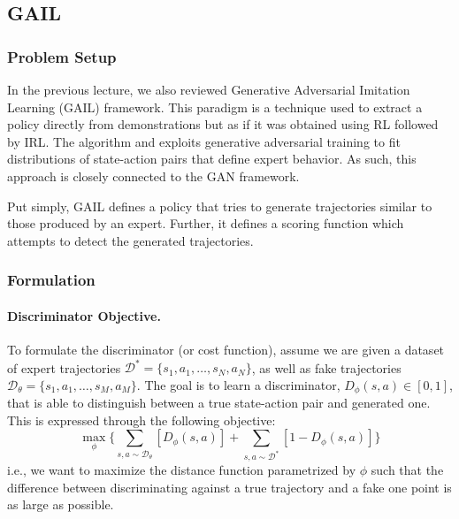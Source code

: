 \documentclass[11pt]{article}
\begin{document}
\subsection{GAIL}

\subsubsection{Problem Setup} 

In the previous lecture, we also reviewed Generative Adversarial Imitation Learning (GAIL) \cite{ho2016gail} framework. This paradigm is a technique used to extract a policy directly from demonstrations but as if it was obtained using RL followed by IRL. The algorithm and exploits generative adversarial training to fit distributions of state-action pairs that define expert behavior. As such, this approach is closely connected to the GAN \cite{goodfellow2014gan} framework. 

Put simply, GAIL defines a policy that tries to generate trajectories similar to those produced by an expert. Further, it defines a scoring function which attempts to detect the generated trajectories.

\subsubsection{Formulation}

\paragraph{Discriminator Objective.} To formulate the discriminator (or cost function), assume we are given a dataset of expert trajectories $\mathcal{D}^\ast = \{s_1, a_1, \dots, s_N, a_N\}$, as well as fake trajectories $\mathcal{D}_\theta = \{s_1, a_1, \dots, s_M, a_M\}$. The goal is to learn a discriminator, $D_\phi (s, a) \in [0, 1]$, that is able to distinguish between a true state-action pair and generated one. This is expressed through the following objective: 
\begin{equation}
    \label{eq:gail_d}
    \max_{\phi} \Big\{ 
    \sum\limits_{s, a\sim\mathcal{D_\theta}} [D_{\phi}(s, a)] +
    \sum\limits_{s, a\sim\mathcal{D}^\ast} [1 - D_{\phi}(s, a)] \Big\}
\end{equation}
i.e., we want to maximize the distance function parametrized by $\phi$ such that the difference between discriminating against a true trajectory and a fake one point is as large as possible.
\end{document}
